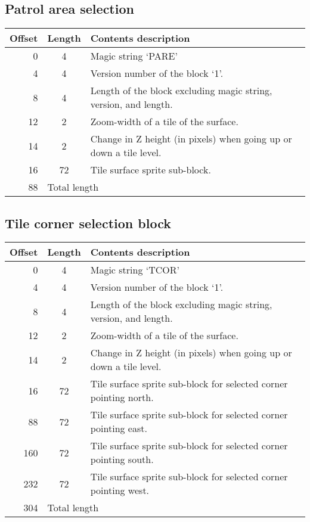 \documentclass{article}
\begin{document}
\subsection{Patrol area selection}
\begin{center}
\begin{tabular}{|r|c|l|} \hline
\textbf{Offset} & \textbf{Length} & \textbf{Contents description} \\ \hline
   0 &  4 & Magic string `PARE' \\
   4 &  4 & Version number of the block `1'. \\
   8 &  4 & Length of the block excluding magic string, version, and length. \\
  12 &  2 & Zoom-width of a tile of the surface. \\
  14 &  2 & Change in Z height (in pixels) when going up or down a tile level. \\
  16 & 72 & Tile surface sprite sub-block. \\ \hline
  88 & \multicolumn{2}{l|}{Total length} \\ \hline
\end{tabular}
\end{center}


\subsection{Tile corner selection block}
\begin{center}
\begin{tabular}{|r|c|l|} \hline
\textbf{Offset} & \textbf{Length} & \textbf{Contents description} \\ \hline
   0 &  4 & Magic string `TCOR' \\
   4 &  4 & Version number of the block `1'. \\
   8 &  4 & Length of the block excluding magic string, version, and length. \\
  12 &  2 & Zoom-width of a tile of the surface. \\
  14 &  2 & Change in Z height (in pixels) when going up or down a tile level. \\
  16 & 72 & Tile surface sprite sub-block for selected corner pointing north. \\
  88 & 72 & Tile surface sprite sub-block for selected corner pointing east. \\
 160 & 72 & Tile surface sprite sub-block for selected corner pointing south. \\
 232 & 72 & Tile surface sprite sub-block for selected corner pointing west. \\ \hline
 304 & \multicolumn{2}{l|}{Total length} \\ \hline
\end{tabular}
\end{center}
\end{document}
